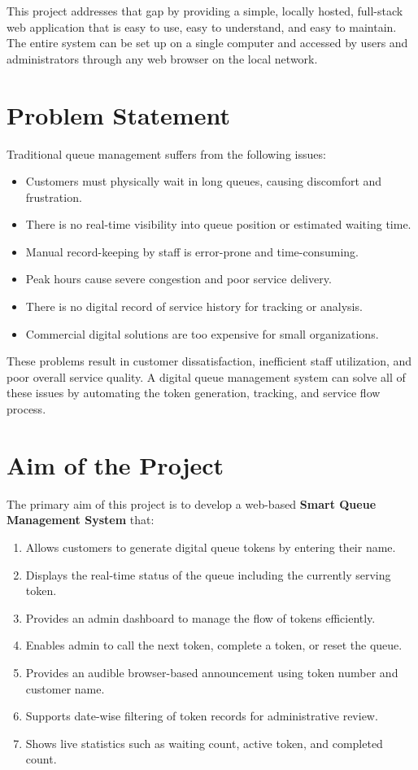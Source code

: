 This project addresses that gap by providing a simple, locally hosted, full-stack web application that is easy to use, easy to understand, and easy to maintain. The entire system can be set up on a single computer and accessed by users and administrators through any web browser on the local network.

\section{Problem Statement}

Traditional queue management suffers from the following issues:

\begin{itemize}
    \item Customers must physically wait in long queues, causing discomfort and frustration.
    \item There is no real-time visibility into queue position or estimated waiting time.
    \item Manual record-keeping by staff is error-prone and time-consuming.
    \item Peak hours cause severe congestion and poor service delivery.
    \item There is no digital record of service history for tracking or analysis.
    \item Commercial digital solutions are too expensive for small organizations.
\end{itemize}

These problems result in customer dissatisfaction, inefficient staff utilization, and poor overall service quality. A digital queue management system can solve all of these issues by automating the token generation, tracking, and service flow process.

\section{Aim of the Project}

The primary aim of this project is to develop a web-based \textbf{Smart Queue Management System} that:

\begin{enumerate}
    \item Allows customers to generate digital queue tokens by entering their name.
    \item Displays the real-time status of the queue including the currently serving token.
    \item Provides an admin dashboard to manage the flow of tokens efficiently.
    \item Enables admin to call the next token, complete a token, or reset the queue.
    \item Provides an audible browser-based announcement using token number and customer name.
    \item Supports date-wise filtering of token records for administrative review.
    \item Shows live statistics such as waiting count, active token, and completed count.
\end{enumerate}

